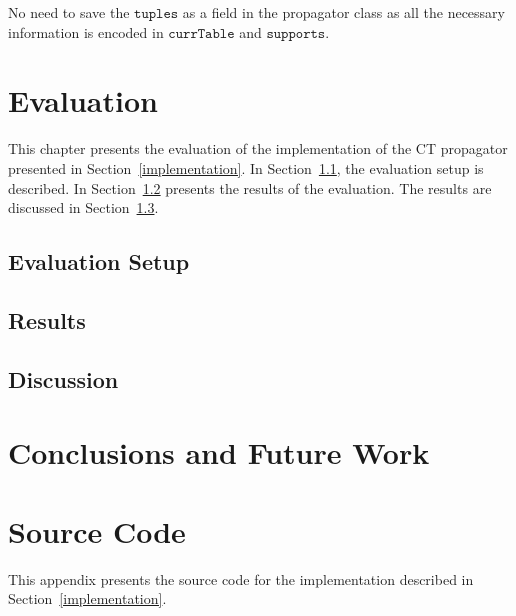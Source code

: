 \documentclass[a4paper,11pt]{article}
\newcommand{\T}[1]{\texttt{#1}}
\newcommand{\Secref}[1]{Section~\ref{#1}}
\newcommand{\Chapref}[1]{Section~\ref{#1}}
\newcommand{\CurrTable}{\texttt{currTable}}
\newcommand{\Supports}{\texttt{supports}}
\numberwithin{equation}{section}
\begin{document}
No need to save the $\T{tuples}$ as a field in the propagator class as all
the necessary information is encoded in $\CurrTable$ and $\Supports$.









\section{Evaluation}
\label{evaluation}
This chapter presents the evaluation of the implementation of the CT propagator
presented in \Chapref{implementation}. In \Secref{evaluation:setup},
the evaluation setup is described. In \Secref{evaluation:results} presents
the results of the evaluation. The results are discussed in \Secref{evaluation:discussion}.

\subsection{Evaluation Setup}
\label{evaluation:setup}
\subsection{Results}
\label{evaluation:results}
\subsection{Discussion}
\label{evaluation:discussion}

\section{Conclusions and Future Work}
\label{conclusions}




\appendix
\section{Source Code}
\label{source code}

This appendix presents the source code for the implementation described in \Chapref{implementation}.
\end{document}
